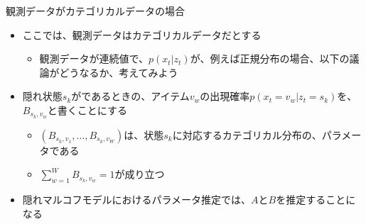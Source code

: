 \documentclass[aspectratio=169,unicode,dvipdfmx,14pt]{beamer}
\begin{document}
\begin{frame}{観測データがカテゴリカルデータの場合}
\begin{itemize}
\item ここでは、観測データはカテゴリカルデータだとする
\begin{itemize}
\item 観測データが連続値で、$p(x_t|z_t)$が、例えば正規分布の場合、以下の議論がどうなるか、考えてみよう
\end{itemize}
\item 隠れ状態$s_k$がであるときの、アイテム$v_w$の出現確率$p(x_t=v_w|z_t=s_k)$を、$B_{s_k,v_w}$と書くことにする
\begin{itemize}
\item $(B_{s_k,v_1}, \ldots, B_{s_k,v_W})$は、状態$s_k$に対応するカテゴリカル分布の、パラメータである
\item $\sum_{w=1}^W B_{s_k,v_w} = 1$が成り立つ
\end{itemize}
\item 隠れマルコフモデルにおけるパラメータ推定では、$A$と$B$を推定することになる
\end{itemize}
\end{frame}
\end{document}
